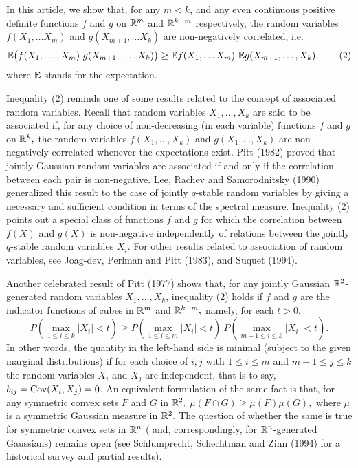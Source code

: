 In this article, we show that, for any $m<k$, and any even 
continuous positive definite
functions $f$ and $g$ on $\Bbb R^m$ and $\Bbb R^{k-m}$ respectively,
the random variables $f(X_1,\dots X_m)$ and $g(X_{m+1},\dots X_k)$
are non-negatively correlated, i.e.
$$\Bbb E\big(f(X_1,\dots, X_m)\  g(X_{m+1},\dots, X_k)\big) \ge
\Bbb E f(X_1,\dots X_m)  
\ \Bbb E g(X_{m+1},\dots, X_k),\tag{2}$$
where $\Bbb E$ stands for the expectation.

\bigbreak
Inequality (2) reminds one of some results related
to the concept of associated random variables. Recall 
that random
variables $X_1,\dots,X_k$ are said to be associated 
if, for any choice of non-decreasing (in each variable)
functions $f$ and $g$ on $\Bbb R^k,$ the random variables 
$f(X_1,\dots,X_k)$ and $g(X_1,\dots,X_k)$ are non-negatively
correlated whenever the expectations exist. 
Pitt (1982) proved that jointly Gaussian 
random variables are associated if and only if the 
correlation between each pair is non-negative.
Lee, Rachev and Samorodnitsky (1990) generalized this 
result to the case of jointly $q$-stable random variables
by giving a necessary and sufficient condition in terms of 
the spectral measure. Inequality (2) points out a special
class of functions $f$ and $g$ for which the correlation between
$f(X)$ and $g(X)$ is non-negative independently of  
relations between the jointly $q$-stable random variables $X_i$.  
For other results related to association of random variables, see
Joag-dev, Perlman and Pitt (1983), and Suquet (1994).

\medbreak

Another celebrated result of Pitt (1977) shows that, 
for any jointly Gaussian $\Bbb R^2$-generated random variables 
$X_1,\dots, X_k$, 
inequality (2) holds if $f$ and $g$ are the indicator 
functions of cubes in $\Bbb R^m$ and $\Bbb R^{k-m},$
namely, for each $t>0,$
$$P(\max_{1\le i\le k} |X_i|<t) \ge
P(\max_{1\le i\le m} |X_i|<t)        
\ P(\max_{m+1\le i\le k} |X_i|<t).\tag{3}$$
In other words, the quantity in the left-hand side
is minimal (subject to the given marginal distributions) 
if for each choice of $i,j$ with  $1\le i\le m$ 
and  $m+1\le j\le k$
the random variables $X_i$ and $X_j$ are independent,
that is to say, $b_{ij}= \hbox{\rm Cov}
(X_i,X_j)=0$.  An equivalent formulation
of the same fact is that, for any symmetric convex sets
$F$  and $G$ in $\Bbb R^2,$ $\mu(F\cap G)\ge \mu(F)\mu(G),$
where $\mu$ is a symmetric Gaussian measure in $\Bbb R^2.$
The question of whether
the same is true for symmetric convex sets in $\Bbb R^n$
( and, correspondingly, for $\Bbb R^n$-generated Gaussians)
remains open (see Schlumprecht, Schechtman and Zinn (1994)
for a historical survey and partial results).

